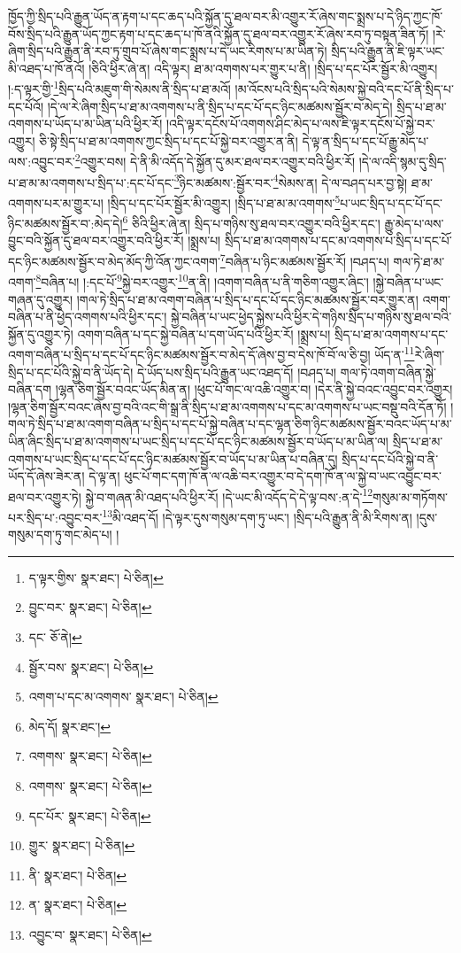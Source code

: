 ཁྱོད་ཀྱི་སྲིད་པའི་རྒྱུན་ཡོད་ན་རྟག་པ་དང་ཆད་པའི་སྐྱོན་དུ་ཐལ་བར་མི་འགྱུར་རོ་ཞེས་གང་སྨྲས་པ་དེ་ཉིད་ཀྱང་ཁོ་བོས་སྲིད་པའི་རྒྱུན་ཡོད་ཀྱང་རྟག་པ་དང་ཆད་པ་ཁོ་ནའི་སྐྱོན་དུ་ཐལ་བར་འགྱུར་རོ་ཞེས་རབ་ཏུ་བསྟན་ཟིན་ཏོ། །རེ་ཞིག་སྲིད་པའི་རྒྱུན་ནི་རབ་ཏུ་གྲུབ་པོ་ཞེས་གང་སྨྲས་པ་དེ་ཡང་རིགས་པ་མ་ཡིན་ཏེ། སྲིད་པའི་རྒྱུན་ནི་ཇི་ལྟར་ཡང་མི་འཐད་པ་ཁོ་ནའོ། །ཅིའི་ཕྱིར་ཞེ་ན། འདི་ལྟར། ཐ་མ་འགགས་པར་གྱུར་པ་ནི། །སྲིད་པ་དང་པོར་སྦྱོར་མི་འགྱུར། །:ད་ལྟར་གྱི་\footnote{ད་ལྟར་གྱིས་  སྣར་ཐང་།  པེ་ཅིན། }སྲིད་པའི་མཇུག་གི་སེམས་ནི་སྲིད་པ་ཐ་མའོ། །མ་འོངས་པའི་སྲིད་པའི་སེམས་སྐྱེ་བའི་དང་པོ་ནི་སྲིད་པ་དང་པོའོ། །དེ་ལ་རེ་ཞིག་སྲིད་པ་ཐ་མ་འགགས་པ་ནི་སྲིད་པ་དང་པོ་དང་ཉིང་མཚམས་སྦྱོར་བ་མེད་དེ། སྲིད་པ་ཐ་མ་འགགས་པ་ཡོད་པ་མ་ཡིན་པའི་ཕྱིར་རོ། །འདི་ལྟར་དངོས་པོ་འགགས་ཤིང་མེད་པ་ལས་ཇི་ལྟར་དངོས་པོ་སྐྱེ་བར་འགྱུར། ཅི་སྟེ་སྲིད་པ་ཐ་མ་འགགས་ཀྱང་སྲིད་པ་དང་པོ་སྐྱེ་བར་འགྱུར་ན་ནི། དེ་ལྟ་ན་སྲིད་པ་དང་པོ་རྒྱུ་མེད་པ་ལས་:འབྱུང་བར་\footnote{བྱུང་བར་  སྣར་ཐང་།  པེ་ཅིན། }འགྱུར་བས། དེ་ནི་མི་འདོད་དེ་སྐྱོན་དུ་མར་ཐལ་བར་འགྱུར་བའི་ཕྱིར་རོ། །དེ་ལ་འདི་སྙམ་དུ་སྲིད་པ་ཐ་མ་མ་འགགས་པ་སྲིད་པ་:དང་པོ་དང་\footnote{དང་  ཅོ་ནེ། }ཉིང་མཚམས་:སྦྱོར་བར་\footnote{སྦྱོར་བས་  སྣར་ཐང་།  པེ་ཅིན། }སེམས་ན། དེ་ལ་བཤད་པར་བྱ་སྟེ། ཐ་མ་འགགས་པར་མ་གྱུར་པ། །སྲིད་པ་དང་པོར་སྦྱོར་མི་འགྱུར། །སྲིད་པ་ཐ་མ་མ་འགགས་\footnote{འགག་པ་དང་མ་འགགས་  སྣར་ཐང་།  པེ་ཅིན། }པ་ཡང་སྲིད་པ་དང་པོ་དང་ཉིང་མཚམས་སྦྱོར་བ་:མེད་དེ།\footnote{མེད་དོ།  སྣར་ཐང་། } ཅིའི་ཕྱིར་ཞེ་ན། སྲིད་པ་གཉིས་སུ་ཐལ་བར་འགྱུར་བའི་ཕྱིར་དང་། རྒྱུ་མེད་པ་ལས་བྱུང་བའི་སྐྱོན་དུ་ཐལ་བར་འགྱུར་བའི་ཕྱིར་རོ། །སྨྲས་པ། སྲིད་པ་ཐ་མ་འགགས་པ་དང་མ་འགགས་པ་སྲིད་པ་དང་པོ་དང་ཉིང་མཚམས་སྦྱོར་བ་མེད་མོད་ཀྱི་འོན་ཀྱང་འགག་\footnote{འགགས་  སྣར་ཐང་།  པེ་ཅིན། }བཞིན་པ་ཉིང་མཚམས་སྦྱོར་རོ། །བཤད་པ། གལ་ཏེ་ཐ་མ་འགག་\footnote{འགགས་  སྣར་ཐང་།  པེ་ཅིན། }བཞིན་པ། །:དང་པོ་\footnote{དང་པོར་  སྣར་ཐང་།  པེ་ཅིན། }སྐྱེ་བར་འགྱུར་\footnote{གྱུར་  སྣར་ཐང་།  པེ་ཅིན། }ན་ནི། །འགག་བཞིན་པ་ནི་གཅིག་འགྱུར་ཞིང་། །སྐྱེ་བཞིན་པ་ཡང་གཞན་དུ་འགྱུར། །གལ་ཏེ་སྲིད་པ་ཐ་མ་འགག་བཞིན་པ་སྲིད་པ་དང་པོ་དང་ཉིང་མཚམས་སྦྱོར་བར་གྱུར་ན། འགག་བཞིན་པ་ནི་ཕྱེད་འགགས་པའི་ཕྱིར་དང་། སྐྱེ་བཞིན་པ་ཡང་ཕྱེད་སྐྱེས་པའི་ཕྱིར་དེ་གཉིས་སྲིད་པ་གཉིས་སུ་ཐལ་བའི་སྐྱོན་དུ་འགྱུར་ཏེ། འགག་བཞིན་པ་དང་སྐྱེ་བཞིན་པ་དག་ཡོད་པའི་ཕྱིར་རོ། །སྨྲས་པ། སྲིད་པ་ཐ་མ་འགགས་པ་དང་འགག་བཞིན་པ་སྲིད་པ་དང་པོ་དང་ཉིང་མཚམས་སྦྱོར་བ་མེད་དོ་ཞེས་བྱ་བ་དེས་ཁོ་བོ་ལ་ཅི་བྱ། ཡོད་ན་\footnote{ནི་  སྣར་ཐང་།  པེ་ཅིན། }རེ་ཞིག་སྲིད་པ་དང་པོའི་སྐྱེ་བ་ནི་ཡོད་དེ། དེ་ཡོད་པས་སྲིད་པའི་རྒྱུན་ཡང་འཐད་དོ། །བཤད་པ། གལ་ཏེ་འགག་བཞིན་སྐྱེ་བཞིན་དག །ལྷན་ཅིག་སྦྱོར་བའང་ཡོད་མིན་ན། །ཕུང་པོ་གང་ལ་འཆི་འགྱུར་བ། །དེར་ནི་སྐྱེ་བའང་འབྱུང་བར་འགྱུར། །ལྷན་ཅིག་སྦྱོར་བའང་ཞེས་བྱ་བའི་འང་གི་སྒྲ་ནི་སྲིད་པ་ཐ་མ་འགགས་པ་དང་མ་འགགས་པ་ཡང་བསྡུ་བའི་དོན་ཏོ། །གལ་ཏེ་སྲིད་པ་ཐ་མ་འགག་བཞིན་པ་སྲིད་པ་དང་པོ་སྐྱེ་བཞིན་པ་དང་ལྷན་ཅིག་ཉིང་མཚམས་སྦྱོར་བའང་ཡོད་པ་མ་ཡིན་ཞིང་སྲིད་པ་ཐ་མ་འགགས་པ་ཡང་སྲིད་པ་དང་པོ་དང་ཉིང་མཚམས་སྦྱོར་བ་ཡོད་པ་མ་ཡིན་ལ། སྲིད་པ་ཐ་མ་འགགས་པ་ཡང་སྲིད་པ་དང་པོ་དང་ཉིང་མཚམས་སྦྱོར་བ་ཡོད་པ་མ་ཡིན་པ་བཞིན་དུ། སྲིད་པ་དང་པོའི་སྐྱེ་བ་ནི་ཡོད་དོ་ཞེས་ཟེར་ན། དེ་ལྟ་ན། ཕུང་པོ་གང་དག་ཁོ་ན་ལ་འཆི་བར་འགྱུར་བ་དེ་དག་ཁོ་ན་ལ་སྐྱེ་བ་ཡང་འབྱུང་བར་ཐལ་བར་འགྱུར་ཏེ། སྐྱེ་བ་གཞན་མི་འཐད་པའི་ཕྱིར་རོ། །དེ་ཡང་མི་འདོད་དེ་དེ་ལྟ་བས་:ན་དེ་\footnote{ན་  སྣར་ཐང་།  པེ་ཅིན། }གསུམ་མ་གཏོགས་པར་སྲིད་པ་:འབྱུང་བར་\footnote{འབྱུང་བ་  སྣར་ཐང་།  པེ་ཅིན། }མི་འཐད་དོ། །དེ་ལྟར་དུས་གསུམ་དག་ཏུ་ཡང་། །སྲིད་པའི་རྒྱུན་ནི་མི་རིགས་ན། །དུས་གསུམ་དག་ཏུ་གང་མེད་པ། །
